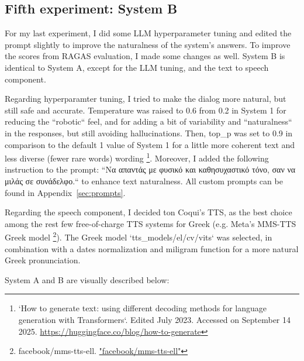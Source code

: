 \subsection{Fifth experiment: System B}
For my last experiment, I did some LLM hyperparameter tuning and edited the prompt slightly to improve the naturalness of the system’s answers. To improve the scores from RAGAS evaluation, I made some changes as well. System B is identical to System A, except for the LLM tuning, and the text to speech component.

Regarding hyperparamter tuning, I tried to make the dialog more natural, but still safe and accurate. Temperature was raised to 0.6 from 0.2 in System 1 for reducing the ``robotic`` feel, and for adding a bit of variability and ``naturalness`` in the responses, but still avoiding hallucinations. Then, top\_p was set to 0.9 in comparison to the default 1 value of System 1 for a little more coherent text and less diverse (fewer rare words) wording \footnote{`How to generate text: using different decoding methods for language generation with Transformers`. Edited July 2023. Accessed on September 14 2025. \url{https://huggingface.co/blog/how-to-generate}}. Moreover, I added the following instruction to the prompt: ``\textgreek{Να απαντάς με φυσικό και καθησυχαστικό τόνο, σαν να μιλάς σε συνάδελφο.}`` to enhance text naturalness. All custom prompts can be found in Appendix~\ref{sec:prompts}.

Regarding the speech component, I decided ton Coqui's TTS, as the best choice among the rest few free-of-charge TTS systems for Greek (e.g. Meta's MMS-TTS Greek model \footnote{facebook/mms-tts-ell. \url{"facebook/mms-tts-ell"}}). The Greek model `tts\_models/el/cv/vits` was selected, in combination with a dates normalization and miligram function for a more natural Greek pronunciation.



System A and B are visually described below:

\renewcommand{\arraystretch}{1.3}

